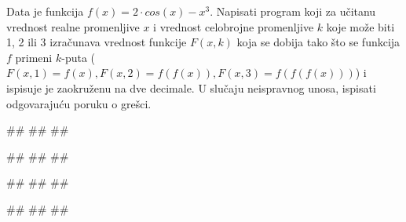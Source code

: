 \begin{Exercise}[label=KT_NG_22] 
Data je funkcija $f(x) = 2 \cdot cos(x) - x^3$. Napisati program koji za učitanu 
vrednost realne promenljive $x$ i vrednost celobrojne promenljive $k$ koje može 
biti 1, 2 ili 3 izračunava vrednost funkcije $F(x, k)$ koja se dobija tako što se 
funkcija $f$ primeni $k$-puta ($F(x,1) = f(x), F(x, 2) = f(f(x)), F(x,3) = f(f(f(x)))$)
i ispisuje je zaokruženu na dve decimale.
U slučaju neispravnog unosa, ispisati odgovarajuću poruku o grešci.

\begin{miditest}
\begin{upotreba}{1}
#\naslovInt#
##
##
\end{upotreba}
\end{miditest}
\begin{miditest}
\begin{upotreba}{2}
#\naslovInt#
##
##
\end{upotreba}
\end{miditest}

\begin{miditest}
\begin{upotreba}{3}
#\naslovInt#
##
##
\end{upotreba}
\end{miditest}
\begin{miditest}
\begin{upotreba}{4}
#\naslovInt#
##
##
\end{upotreba}
\end{miditest}

\end{Exercise}
\ifresenja
 \begin{Answer}[ref=KT_NG_22]
\end{Answer}
\fi



